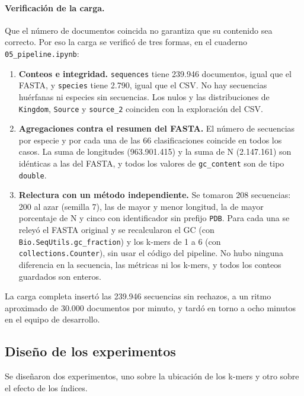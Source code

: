 \documentclass[pdflatex,lineno,referee,sn-vancouver-num]{sn-jnl}
\theoremstyle{thmstyleone}%
\theoremstyle{thmstyletwo}%
\theoremstyle{thmstylethree}%
\begin{document}
\paragraph{Verificación de la carga.} Que el número de documentos coincida no garantiza que su contenido sea correcto. Por eso la carga se verificó de tres formas, en el cuaderno \texttt{05\_pipeline.ipynb}:

\begin{enumerate}
  \item \textbf{Conteos e integridad.} \texttt{sequences} tiene 239.946 documentos, igual que el FASTA, y \texttt{species} tiene 2.790, igual que el CSV. No hay secuencias huérfanas ni especies sin secuencias. Los nulos y las distribuciones de \texttt{Kingdom}, \texttt{Source} y \texttt{source\_2} coinciden con la exploración del CSV.
  \item \textbf{Agregaciones contra el resumen del FASTA.} El número de secuencias por especie y por cada una de las 66 clasificaciones coincide en todos los casos. La suma de longitudes (963.901.415) y la suma de N (2.147.161) son idénticas a las del FASTA, y todos los valores de \texttt{gc\_content} son de tipo \texttt{double}.
  \item \textbf{Relectura con un método independiente.} Se tomaron 208 secuencias: 200 al azar (semilla 7), las de mayor y menor longitud, la de mayor porcentaje de N y cinco con identificador sin prefijo \texttt{PDB}. Para cada una se releyó el FASTA original y se recalcularon el GC (con \texttt{Bio.SeqUtils.gc\_fraction}) y los k-mers de 1 a 6 (con \texttt{collections.Counter}), sin usar el código del pipeline. No hubo ninguna diferencia en la secuencia, las métricas ni los k-mers, y todos los conteos guardados son enteros.
\end{enumerate}

La carga completa insertó las 239.946 secuencias sin rechazos, a un ritmo aproximado de 30.000 documentos por minuto, y tardó en torno a ocho minutos en el equipo de desarrollo.

\subsection{Diseño de los experimentos}\label{subsec:experimentos}

Se diseñaron dos experimentos, uno sobre la ubicación de los k-mers y otro sobre el efecto de los índices.
\end{document}
